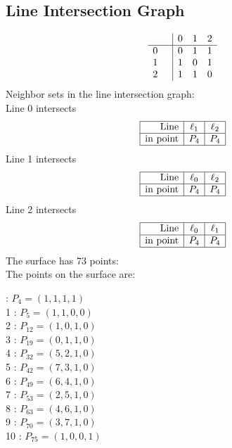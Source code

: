 \documentclass{article}
\begin{document}
{\subsection*{Line Intersection Graph}
{\arraycolsep=1pt
$$
\begin{array}{rr|*{3}r}
 &  & 0 & 1 & 2\\
\hline
0 &  & 0 & 1 & 1\\
1 &  & 1 & 0 & 1\\
2 &  & 1 & 1 & 0\\
\end{array}
$$
}%
Neighbor sets in the line intersection graph:\\
Line 0 intersects 
$$
\begin{array}{|r*{2}{|c}|}
\hline
\mbox{Line}  & \ell_{1} & \ell_{2}\\
\hline
\mbox{in point}  & P_{4} & P_{4}\\
\hline
\end{array}
$$
Line 1 intersects 
$$
\begin{array}{|r*{2}{|c}|}
\hline
\mbox{Line}  & \ell_{0} & \ell_{2}\\
\hline
\mbox{in point}  & P_{4} & P_{4}\\
\hline
\end{array}
$$
Line 2 intersects 
$$
\begin{array}{|r*{2}{|c}|}
\hline
\mbox{Line}  & \ell_{0} & \ell_{1}\\
\hline
\mbox{in point}  & P_{4} & P_{4}\\
\hline
\end{array}
$$
The surface has 73 points:\\
The points on the surface are:\\
\begin{multicols}{3}
 : $P_{4}=( 1, 1, 1, 1 )$\\
1 : $P_{5}=( 1, 1, 0, 0 )$\\
2 : $P_{12}=( 1, 0, 1, 0 )$\\
3 : $P_{19}=( 0, 1, 1, 0 )$\\
4 : $P_{32}=( 5, 2, 1, 0 )$\\
5 : $P_{42}=( 7, 3, 1, 0 )$\\
6 : $P_{49}=( 6, 4, 1, 0 )$\\
7 : $P_{53}=( 2, 5, 1, 0 )$\\
8 : $P_{63}=( 4, 6, 1, 0 )$\\
9 : $P_{70}=( 3, 7, 1, 0 )$\\
10 : $P_{75}=( 1, 0, 0, 1 )$\\

\end{multicols}}
\end{document}
